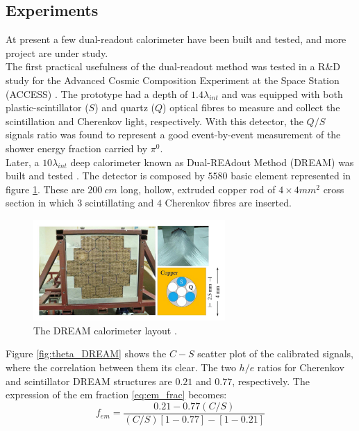 \subsection{Experiments}
At present a few dual-readout calorimeter have been built and tested, and more project are under study.\\
The first practical usefulness of the dual-readout method was tested in a R\&D study for the Advanced Cosmic Composition Experiment at the Space Station (ACCESS) \cite{ACCESS}. The prototype had a depth of $1.4\lambda_{int}$ and was equipped with both plastic-scintillator ($S$) and quartz ($Q$) optical fibres to measure and collect the scintillation and Cherenkov light, respectively. With this detector, the $Q/S$ signals ratio was found to represent a good event-by-event measurement of the shower energy fraction carried by $\pi^0$.\\
Later, a $10 \lambda_{int}$ deep calorimeter known as Dual-REAdout Method (DREAM) was built and tested \cite{DREAM1, DREAM2}. 
The detector is composed by $5580$ basic element represented in figure \ref{fig:DREAM}. These are $200\ cm$ long, hollow, extruded copper rod of $4\times 4 mm^2$ cross section in which $3$ scintillating and $4$ Cherenkov fibres are inserted.
\begin{figure}
	\centering
	\includegraphics[width=0.65\textwidth]{IMG/Cap2/DREAM.png}
	\caption{The DREAM calorimeter layout \cite{DREAM}.}
	\label{fig:DREAM}
\end{figure}

Figure \ref{fig:theta_DREAM} shows the $C-S$ scatter plot of the calibrated signals, where the correlation between them its clear.
The two $h/e$ ratios for Cherenkov and scintillator DREAM structures are $0.21$ and $0.77$, respectively. The expression of the em fraction \ref{eq:em_frac} becomes:
\begin{equation}
    f_{em} = \frac{0.21-0.77(C/S)}{(C/S)\left[1-0.77\right]-\left[1-0.21\right]}
\end{equation}

